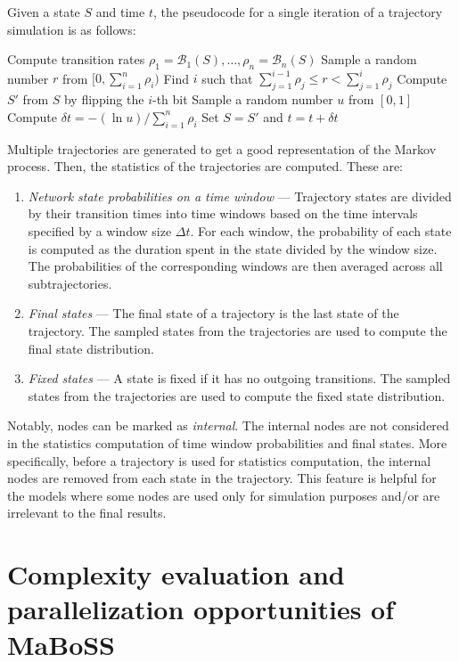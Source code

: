 \documentclass[times, twoside]{zHenriquesLab-StyleBioRxiv}
\begin{document}
Given a state $S$ and time $t$, the pseudocode for a single iteration of a trajectory simulation is as follows:
\begin{algorithmic}[1]
\State Compute transition rates $\rho_1 = \mathcal{B}_1(S), \dots, \rho_n = \mathcal{B}_n(S)$
\State Sample a random number $r$ from $[0, \sum_{i=1}^n \rho_i)$
\State Find $i$ such that $\sum_{j=1}^{i-1} \rho_j \leq r < \sum_{j=1}^{i} \rho_j$
\State Compute $S'$ from $S$ by flipping the $i$-th bit
\State Sample a random number $u$ from $[0, 1]$
\State Compute $\delta t = -(\ln u) / \sum_{i=1}^n \rho_i$
\State Set $S = S'$ and $t = t + \delta t$
\end{algorithmic}

Multiple trajectories are generated to get a good representation of the Markov process. Then, the statistics of the trajectories are computed. These are:

\begin{enumerate}
    \item \emph{Network state probabilities on a time window} --- Trajectory states are divided by their transition times into time windows based on the time intervals specified by a window size $\Delta t$. For each window, the probability of each state is computed as the duration spent in the state divided by the window size. The probabilities of the corresponding windows are then averaged across all subtrajectories.
    \item \emph{Final states} --- The final state of a trajectory is the last state of the trajectory. The sampled states from the trajectories are used to compute the final state distribution.
    \item \emph{Fixed states} --- A state is fixed if it has no outgoing transitions. The sampled states from the trajectories are used to compute the fixed state distribution.
\end{enumerate}

Notably, nodes can be marked as \emph{internal}. The internal nodes are not considered in the statistics computation of time window probabilities and final states. More specifically, before a trajectory is used for statistics computation, the internal nodes are removed from each state in the trajectory.
This feature is helpful for the models where some nodes are used only for simulation purposes and/or are irrelevant to the final results.


\section*{Complexity evaluation and parallelization opportunities of MaBoSS}
\end{document}

